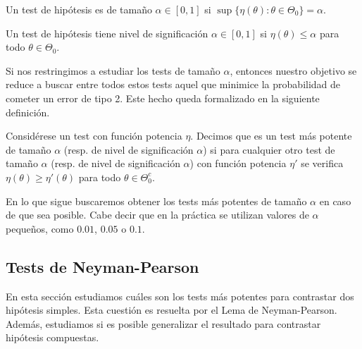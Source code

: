         \begin{definition}
            Un test de hipótesis es de tamaño $\alpha \in [0,1]$ si $\sup\{\eta(\theta): \theta \in \Theta_0\} = \alpha$.
        \end{definition}

        \begin{definition}
            Un test de hipótesis tiene nivel de significación $\alpha \in [0,1]$ si $\eta(\theta) \le \alpha$ para todo $\theta \in \Theta_0$.
        \end{definition}

        Si nos restringimos a estudiar los tests de tamaño $\alpha$, entonces nuestro objetivo se reduce a buscar entre todos estos tests aquel que minimice la probabilidad de cometer un error de tipo 2. Este hecho queda formalizado en la siguiente definición.

        \begin{definition}
            Considérese un test con función potencia $\eta$. Decimos que es un test más potente de tamaño $\alpha$ (resp. de nivel de significación $\alpha$)  si para cualquier otro test de tamaño $\alpha$ (resp. de nivel de significación $\alpha$) con función potencia $\eta'$ se verifica $\eta(\theta) \ge \eta'(\theta)$ para todo $\theta \in \Theta_0^c$.
        \end{definition}

        En lo que sigue buscaremos obtener los tests más potentes de tamaño $\alpha$ en caso de que sea posible. Cabe decir que en la práctica se utilizan valores de $\alpha$ pequeños, como $0.01$, $0.05$ o $0.1$.

    \subsection{Tests de Neyman-Pearson}

        En esta sección estudiamos cuáles son los tests más potentes para contrastar dos hipótesis simples. Esta cuestión es resuelta por el Lema de Neyman-Pearson. Además, estudiamos si es posible generalizar el resultado para contrastar hipótesis compuestas.


